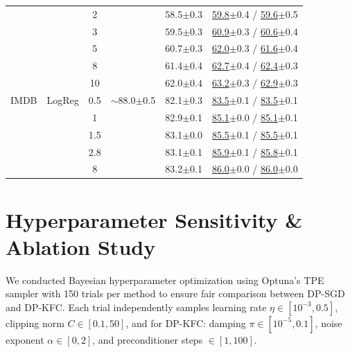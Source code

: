 \documentclass{article}
\theoremstyle{plain}
\theoremstyle{definition}
\theoremstyle{remark}
\begin{document}
\begin{table}[h!]
\begin{tabular}{ll c|c|cc}
 & & 2 & & 58.5{\tiny$\pm$0.3} & \underline{59.8}{\tiny$\pm$0.4} / \underline{59.6}{\tiny$\pm$0.5} \\
 & & 3 & & 59.5{\tiny$\pm$0.3} & \underline{60.9}{\tiny$\pm$0.3} / \underline{60.6}{\tiny$\pm$0.4} \\
 & & 5 & & 60.7{\tiny$\pm$0.3} & \underline{62.0}{\tiny$\pm$0.3} / \underline{61.6}{\tiny$\pm$0.4} \\
 & & 8 & & 61.4{\tiny$\pm$0.4} & \underline{62.7}{\tiny$\pm$0.4} / \underline{62.4}{\tiny$\pm$0.3} \\
 & & 10 & & 62.0{\tiny$\pm$0.4} & \underline{63.2}{\tiny$\pm$0.3} / \underline{62.9}{\tiny$\pm$0.3} \\
\midrule
IMDB & LogReg & 0.5 & $\sim$88.0{\tiny$\pm$0.5} & 82.1{\tiny$\pm$0.3} & \underline{83.5}{\tiny$\pm$0.1} / \underline{83.5}{\tiny$\pm$0.1} \\
 & & 1 & & 82.9{\tiny$\pm$0.1} & \underline{85.1}{\tiny$\pm$0.0} / \underline{85.1}{\tiny$\pm$0.1} \\
 & & 1.5 & & 83.1{\tiny$\pm$0.0} & \underline{85.5}{\tiny$\pm$0.1} / \underline{85.5}{\tiny$\pm$0.1} \\
 & & 2.8 & & 83.1{\tiny$\pm$0.1} & \underline{85.9}{\tiny$\pm$0.1} / \underline{85.8}{\tiny$\pm$0.1} \\
 & & 8 & & 83.2{\tiny$\pm$0.1} & \underline{86.0}{\tiny$\pm$0.0} / \underline{86.0}{\tiny$\pm$0.0} \\
\bottomrule
\end{tabular}
\end{table}



\clearpage

\section{Hyperparameter Sensitivity \& Ablation Study}
\label{app:sensitivity}

  We conducted Bayesian hyperparameter optimization using Optuna's TPE sampler with 150 trials per method to ensure fair
  comparison between DP-SGD and DP-KFC. Each trial independently samples learning rate $\eta \in [10^{-3}, 0.5]$, clipping norm
  $C \in [0.1, 50]$, and for DP-KFC: damping $\pi \in [10^{-5}, 0.1]$, noise exponent $\alpha \in [0, 2]$, and preconditioner
  steps $\in [1, 100]$.
\end{document}
